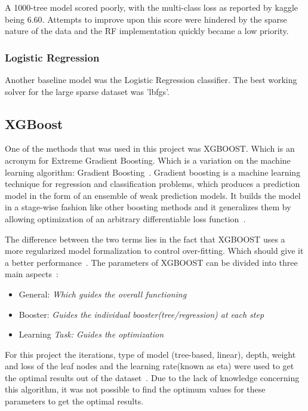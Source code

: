 \documentclass[runningheads,a4paper]{llncs}
\begin{document}
A 1000-tree model scored poorly, with the multi-class loss as reported by kaggle being 6.60. Attempts to improve upon this score were hindered by the sparse nature of the data and the RF implementation quickly became a low priority.

\subsubsection{Logistic Regression}
Another baseline model was the Logistic Regression classifier. The best working solver for the large sparse dataset was 'lbfgs'.

\medskip
\subsection{XGBoost}
\medskip
One of the methods that was used in this project was XGBOOST. Which is an acronym for Extreme Gradient Boosting. Which is a variation on the machine learning algorithm: Gradient Boosting~\cite{CT2015}. 
\medskip
Gradient boosting is a machine learning technique for regression and classification problems, which produces a prediction model in the form of an ensemble of weak prediction models. It builds the model in a stage-wise fashion like other boosting methods and it generalizes them by allowing optimization of an arbitrary differentiable loss function~\cite{CT2015}.

\medskip
The difference between the two terms lies in the fact that XGBOOST uses a more regularized model formalization to control over-fitting. Which should give it a better performance~\cite{CT2014}. 
\medskip
The parameters of XGBOOST can be divided into three main aspects~\cite{AJ2016}: 

\begin{itemize}
    \item General: \textit{Which guides the overall functioning}
    \item Booster: \textit{Guides the individual booster(tree/regression) at each step}
    \item Learning \textit{Task: Guides the optimization}
\end{itemize}
\medskip
For this project the iterations, type of model (tree-based, linear), depth, weight and loss of the leaf nodes and the learning rate(known as eta) were used to get the optimal results out of the dataset~\cite{AJ2016}. Due to the lack of knowledge concerning this algorithm, it was not possible to find the optimum values for these parameters to get the optimal results.  
\end{document}
